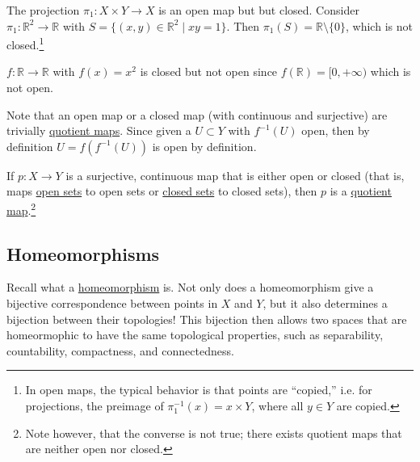  \begin{example}
    \label{ex:open-but-not-closed}
    The projection $\pi_1: X \times Y \rightarrow X$ is an open map but but closed. Consider $\pi_1: \mathbb{R}^2 \rightarrow \mathbb{R}$ with $S = \{(x, y) \in \mathbb{R}^2 \mid xy = 1 \}$. Then $\pi_1 (S) = \mathbb{R} \setminus \{0\}$, which is not closed.\footnote{In open maps, the typical behavior is that points are ``copied,'' i.e. for projections, the preimage of $\pi_1^{-1} (x) = x \times Y$, where all $y \in Y$ are copied.}
  \end{example}

  \begin{example}
    \label{ex:closed-but-not-open}
    $f: \mathbb{R} \rightarrow \mathbb{R}$ with $f(x) = x^2$ is closed but not open since $f(\mathbb{R}) = [0, +\infty)$ which is not open. 
  \end{example}

  Note that an open map or a closed map (with continuous and surjective) are trivially \hyperref[def:quotient-map]{quotient maps}. Since given a $U \subset Y$ with $f^{-1} (U)$ open, then by definition $U = f(f^{-1} (U))$ is open by definition. 

  \begin{theorem}
    \label{thm:open-closed-maps-are-quotient-maps}
    If $p: X \rightarrow Y$ is a surjective, continuous map that is either open or closed (that is, maps \hyperref[def:open-set]{open sets} to open sets or \hyperref[def:closed]{closed sets} to closed sets), then $p$ is a \hyperref[def:quotient-map]{quotient map}.\footnote{Note however, that the converse is not true; there exists quotient maps that are neither open nor closed. }
  \end{theorem} 

  \begin{example}
    \label{ex:quotient-maps-that-are-neither-open-nor-closed}
    
  \end{example}

\subsection{Homeomorphisms}

	Recall what a \href{def:homeomorphism}{homeomorphism} is. Not only does a homeomorphism give a bijective correspondence between points in $X$ and $Y$, but it also determines a bijection between their topologies! This bijection then allows two spaces that are homeormophic to have the same topological properties, such as separability, countability, compactness, and connectedness. 

